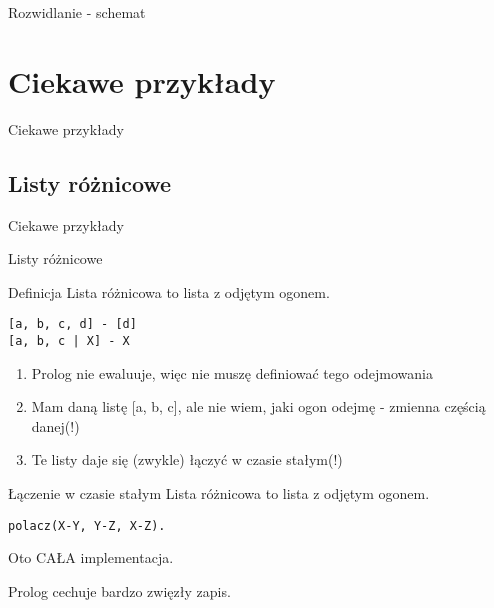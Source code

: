 \documentclass[blue]{beamer}
\newcommand{\tytul}[1]{\begin{frame}\begin{center}\begin{Huge}#1\end{Huge}\end{center}\end{frame}}
\newcommand{\tytulprz}[2]{\begin{frame}\begin{center}\begin{Huge}Ciekawe przykłady\end{Huge}

\hspace{20pt}

\begin{huge}#1\end{huge}

\hspace{10pt}

\begin{large}#2\end{large}\end{center}\end{frame}}
\begin{document}
\begin{frame}{Rozwidlanie - schemat}
\begin{center}
\end{center}
\end{frame}
\section{Ciekawe przykłady}
\tytul{Ciekawe przykłady}
\subsection{Listy różnicowe}
\tytulprz{Listy różnicowe}{}
\begin{frame}[fragile]{Definicja}
Lista różnicowa to lista z odjętym ogonem.
\begin{lstlisting}
[a, b, c, d] - [d]
[a, b, c | X] - X
\end{lstlisting}
\begin{enumerate}
\item Prolog nie ewaluuje, więc nie muszę definiować tego odejmowania
\item Mam daną listę [a, b, c], ale nie wiem, jaki ogon odejmę - zmienna częścią danej(!)
\item Te listy daje się (zwykle) łączyć w czasie stałym(!)
\end{enumerate}
\end{frame}
\begin{frame}[fragile]{Łączenie w czasie stałym}
Lista różnicowa to lista z odjętym ogonem.
\begin{lstlisting}
polacz(X-Y, Y-Z, X-Z).
\end{lstlisting}

Oto CAŁA implementacja.

Prolog cechuje bardzo zwięzły zapis.
\end{frame}
\end{document}
